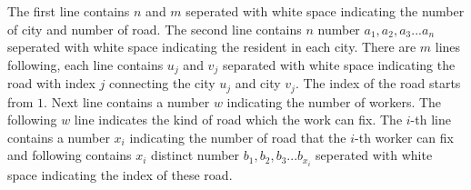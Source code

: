 The first line contains $n$ and $m$ seperated with white space 
indicating the number of city and number of road.
The second line contains $n$ number $a_1,a_2,a_3...a_n$ seperated 
with white space indicating the resident in each city.
There are $m$ lines following, each line contains $u_j$ and $v_j$ 
separated with white space indicating the road with index $j$ 
connecting the city $u_j$ and city $v_j$. 
The index of the road starts from $1$.
Next line contains a number $w$ indicating the number of workers.
The following $w$ line indicates the kind of road which the work can fix.
The $i$-th line contains a number $x_i$ indicating the number of road 
that the $i$-th worker can fix and following contains $x_i$ distinct 
number $b_1,b_2,b_3...b_{x_i}$ seperated with white space indicating 
the index of these road.
